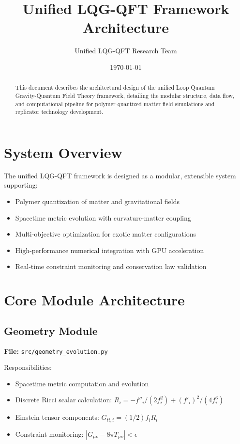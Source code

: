\documentclass[11pt]{article}
\title{Unified LQG-QFT Framework Architecture}
\author{Unified LQG-QFT Research Team}
\date{\today}
\begin{document}
\maketitle

\begin{abstract}
This document describes the architectural design of the unified Loop Quantum Gravity-Quantum Field Theory framework, detailing the modular structure, data flow, and computational pipeline for polymer-quantized matter field simulations and replicator technology development.
\end{abstract}

\section{System Overview}

The unified LQG-QFT framework is designed as a modular, extensible system supporting:
\begin{itemize}
\item Polymer quantization of matter and gravitational fields
\item Spacetime metric evolution with curvature-matter coupling
\item Multi-objective optimization for exotic matter configurations
\item High-performance numerical integration with GPU acceleration
\item Real-time constraint monitoring and conservation law validation
\end{itemize}

\section{Core Module Architecture}

\subsection{Geometry Module}

\textbf{File:} \texttt{src/geometry\_evolution.py}

Responsibilities:
\begin{itemize}
\item Spacetime metric computation and evolution
\item Discrete Ricci scalar calculation: $R_i = -f''_i/(2f_i^2) + (f'_i)^2/(4f_i^3)$
\item Einstein tensor components: $G_{tt,i} = (1/2)f_i R_i$
\item Constraint monitoring: $|G_{\mu\nu} - 8\pi T_{\mu\nu}| < \epsilon$
\end{itemize}
\end{document}
